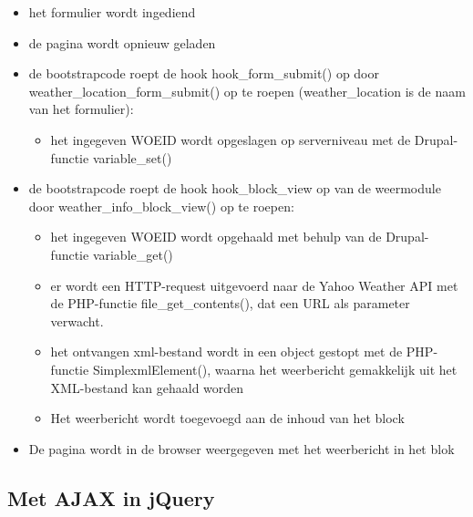 \begin{itemize}
	\item het formulier wordt ingediend
	\item de pagina wordt opnieuw geladen
	\item de bootstrapcode roept de hook hook\_form\_submit() op door weather\_location\_form\_submit() op te roepen (weather\_location is de naam van het formulier):
	\begin{itemize}
		\item het ingegeven WOEID wordt opgeslagen op serverniveau met de Drupal-functie variable\_set()
	\end{itemize}
	\item de bootstrapcode roept de hook hook\_block\_view op van de weermodule door weather\_info\_block\_view() op te roepen:
	\begin{itemize}
		\item het ingegeven WOEID wordt opgehaald met behulp van de Drupal-functie variable\_get()
		\item er wordt een HTTP-request uitgevoerd naar de Yahoo Weather API met de PHP-functie file\_get\_contents(), dat een URL als parameter verwacht.
		\item het ontvangen xml-bestand wordt in een object gestopt met de PHP-functie SimplexmlElement(), waarna het weerbericht gemakkelijk uit het XML-bestand kan gehaald worden
		\item Het weerbericht wordt toegevoegd aan de inhoud van het block
	\end{itemize}
	\item De pagina wordt in de browser weergegeven met het weerbericht in het blok
\end{itemize}

\subsection{Met AJAX in jQuery}

